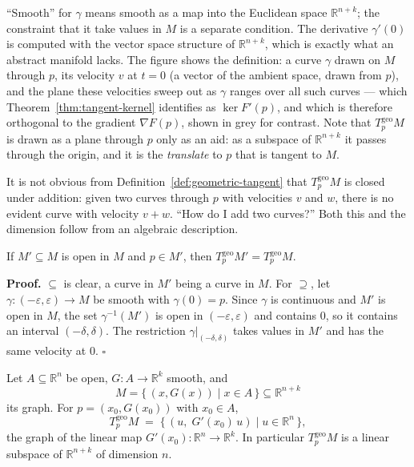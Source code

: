 \documentclass[11pt]{report}
\makeatletter
\newcounter{thmcounter}[section]
\renewenvironment{proof}[1][Proof]{\noindent\textbf{#1.} }{\hfill$\square$\par\vspace{5pt}}
\newcommand{\thmlabel}[1]{\edef\@currentlabel{\arabic{section}.\arabic{thmcounter}}\label{#1}}
\newcommand{\geo}{\mathrm{geo}}
\makeatother
\begin{document}
``Smooth'' for $\gamma$ means smooth as a map into the Euclidean space $\mathbb{R}^{n+k}$; the constraint that it take values in $M$ is a separate condition. The derivative $\gamma'(0)$ is computed with the vector space structure of $\mathbb{R}^{n+k}$, which is exactly what an abstract manifold lacks. The figure shows the definition: a curve $\gamma$ drawn on $M$ through $p$, its velocity $v$ at $t=0$ (a vector of the ambient space, drawn from $p$), and the plane these velocities sweep out as $\gamma$ ranges over all such curves --- which Theorem~\ref{thm:tangent-kernel} identifies as $\ker F'(p)$, and which is therefore orthogonal to the gradient $\nabla F(p)$, shown in grey for contrast. Note that $T^{\geo}_pM$ is drawn as a plane through $p$ only as an aid: as a subspace of $\mathbb{R}^{n+k}$ it passes through the origin, and it is the \emph{translate} to $p$ that is tangent to $M$.

It is not obvious from Definition~\ref{def:geometric-tangent} that $T^{\geo}_pM$ is closed under addition: given two curves through $p$ with velocities $v$ and $w$, there is no evident curve with velocity $v + w$. ``How do I add two curves?'' Both this and the dimension follow from an algebraic description.

\begin{lembox}\thmlabel{lem:tangent-local}
If $M' \subseteq M$ is open in $M$ and $p \in M'$, then $T^{\geo}_pM' = T^{\geo}_pM$.
\end{lembox}

\begin{proof}
$\subseteq$ is clear, a curve in $M'$ being a curve in $M$. For $\supseteq$, let $\gamma : (-\varepsilon,\varepsilon) \to M$ be smooth with $\gamma(0) = p$. Since $\gamma$ is continuous and $M'$ is open in $M$, the set $\gamma^{-1}(M')$ is open in $(-\varepsilon,\varepsilon)$ and contains $0$, so it contains an interval $(-\delta,\delta)$. The restriction $\gamma|_{(-\delta,\delta)}$ takes values in $M'$ and has the same velocity at $0$.
\end{proof}

\begin{lembox}\thmlabel{lem:tangent-graph}
Let $A \subseteq \mathbb{R}^n$ be open, $G : A \to \mathbb{R}^k$ smooth, and
\[
M = \{\, (x, G(x)) \mid x \in A \,\} \subseteq \mathbb{R}^{n+k}
\]
its graph. For $p = (x_0, G(x_0))$ with $x_0 \in A$,
\[
T^{\geo}_pM \;=\; \{\, (u,\; G'(x_0)\,u) \mid u \in \mathbb{R}^n \,\},
\]
the graph of the linear map $G'(x_0) : \mathbb{R}^n \to \mathbb{R}^k$. In particular $T^{\geo}_pM$ is a linear subspace of $\mathbb{R}^{n+k}$ of dimension $n$.
\end{lembox}
\end{document}
